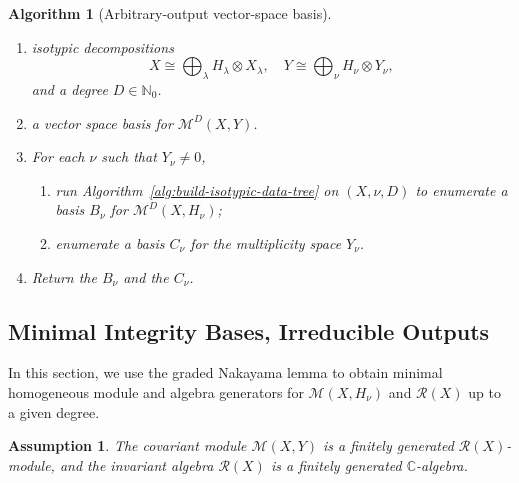 \documentclass[11pt]{article}
\newcommand{\dsC}{\mathbb{C}}
\newcommand{\dsN}{\mathbb{N}}
\newcommand{\scM}{\mathcal{M}}
\newcommand{\scR}{\mathcal{R}}
\newtheorem{algorithm}[theorem]{Algorithm}
\newtheorem{assumption}{Assumption}[section]
\theoremstyle{definition}
\begin{document}
\begin{algorithm}[Arbitrary-output vector-space basis]\label{alg:arbitrary-output-vector-space-basis}

  \phantom{}

  \begin{enumerate}[label=\textbf{Step \arabic*.},leftmargin=2.8cm]

    \item[\textbf{Input:}] isotypic decompositions
    \[
      X\cong \bigoplus_\lambda H_\lambda\otimes X_\lambda,
      \quad
      Y\cong \bigoplus_\nu H_\nu\otimes Y_\nu,
    \]
    and a degree $D \in \dsN_0$.

    \item[\textbf{Output:}] a vector space basis for $\scM^D(X,Y)$.

    \item For each $\nu$ such that $Y_\nu\neq 0$,

    \begin{enumerate}
      \item run Algorithm~\ref{alg:build-isotypic-data-tree} on $(X,\nu,D)$ to enumerate a basis $B_\nu$ for $\scM^D(X,H_\nu)$;

      \item enumerate a basis $C_\nu$ for the multiplicity space $Y_\nu$.
    \end{enumerate}

    \item Return the $B_\nu$ and the $C_\nu$.
  \end{enumerate}
\end{algorithm}



\subsection{Minimal Integrity Bases, Irreducible Outputs}\label{sec:irreducible-generators}

In this section, we use the graded Nakayama lemma to obtain minimal homogeneous module and algebra generators for $\scM(X,H_\nu)$ and $\scR(X)$ up to a given degree.

\begin{assumption}\label{ass:finitely-generated}
  The covariant module $\scM(X,Y)$ is a finitely generated $\scR(X)$-module, and the invariant algebra $\scR(X)$ is a finitely generated $\dsC$-algebra.
\end{assumption}
\end{document}
